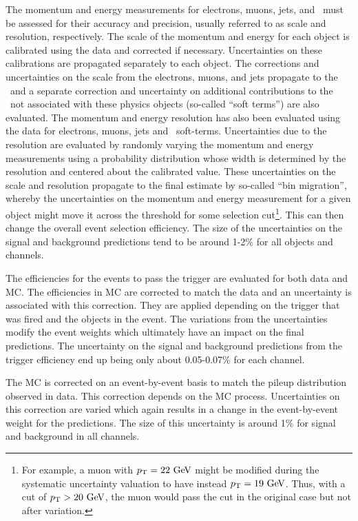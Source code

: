 The momentum and energy measurements for electrons, muons, jets, 
and \MET~must be assessed for their accuracy and precision, usually referred to
as scale and resolution, respectively. The scale of the momentum and energy 
for each object is calibrated using the data and corrected if necessary.
Uncertainties on these calibrations are propagated separately to each object.
The corrections and uncertainties on the scale
from the electrons, muons, and jets propagate to the \MET~and a separate
correction and uncertainty on additional contributions to 
the \MET~not associated with these physics objects (so-called ``soft terms'')
are also evaluated. 
The momentum and energy resolution has also been evaluated using the data
for electrons, muons, jets and \MET~soft-terms.  Uncertainties due to the
resolution are evaluated by randomly varying the momentum and energy measurements
using a probability distribution whose width is determined by the resolution
and centered about the calibrated value. These uncertainties on the scale
and resolution propagate to the final estimate by so-called ``bin migration'',
whereby the uncertainties on the momentum and energy measurement 
for a given object might move it across the threshold for some 
selection cut\footnote{For example, a muon with $\pt = 22 \GeV$ might
be modified during the systematic uncertainty valuation to have instead
$\pt = 19 \GeV$. Thus, with a cut of $\pt > 20 \GeV$, the muon would pass the
cut in the original case but not after variation.}. This can 
then change the overall event selection efficiency. The size of the uncertainties
on the signal and background predictions tend to be around 1-2\% for
all objects and channels.


The efficiencies for the events to pass the trigger are evaluated for both 
data and MC.  The efficiencies in MC are corrected to match the data
and an uncertainty is associated with this correction.  They are applied
depending on the trigger that was fired and the objects in the event.
The variations from the uncertainties
modify the event weights which ultimately have an impact on the final predictions.
The uncertainty on the signal and background predictions from the trigger
efficiency end up being only about 0.05-0.07\%  for each channel.

The MC is corrected on an event-by-event basis to match the 
pileup distribution observed in data. This correction depends on the 
MC process. Uncertainties on this correction are varied which again
results in a change in the event-by-event weight for the predictions. The
size of this uncertainty is around 1\% for signal and background in all channels.



